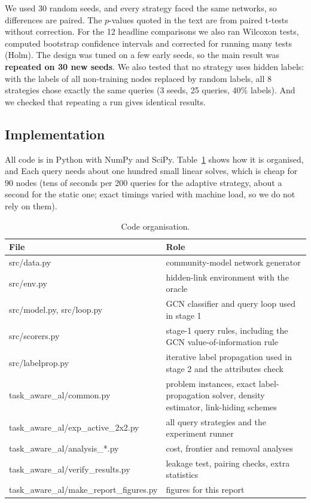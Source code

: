\documentclass[11pt,a4paper]{article}
\begin{document}
We used 30 random seeds, and every strategy faced the same networks, so differences are
paired. The $p$-values quoted in the text are from paired t-tests without correction. For the 12
headline comparisons we also ran Wilcoxon tests, computed bootstrap
confidence intervals and corrected for running many tests (Holm). The design was tuned on a few
early seeds, so the main result was \textbf{repeated on 30 new seeds}. We also tested that no
strategy uses hidden labels: with the labels of all non-training nodes replaced by random
labels, all 8 strategies chose exactly the same queries (3 seeds, 25 queries, 40\% labels). And
we checked that repeating a run gives identical results.

\subsection{Implementation}
All code is in Python with NumPy and SciPy. Table~\ref{tab:code} shows how it is organised, and
Each query needs about
one hundred small linear solves, which is cheap for 90 nodes (tens of seconds per 200 queries
for the adaptive strategy, about a second for the static one; exact timings varied with machine
load, so we do not rely on them).

\begin{table}[htbp]
\centering
\caption{Code organisation.}
\label{tab:code}
\small
\begin{tabularx}{\textwidth}{>{\footnotesize\ttfamily\raggedright\arraybackslash}p{6.2cm}X}
\toprule
\normalfont File & \normalfont Role\\
\midrule
src/data.py & community-model network generator\\
src/env.py & hidden-link environment with the oracle\\
src/model.py, src/loop.py & GCN classifier and query loop used in stage 1\\
src/scorers.py & stage-1 query rules, including the GCN value-of-information rule\\
src/labelprop.py & iterative label propagation used in stage 2 and the attributes check\\
task\_aware\_al/common.py & problem instances, exact label-propagation solver, density estimator, link-hiding schemes\\
task\_aware\_al/exp\_active\_2x2.py & all query strategies and the experiment runner\\
task\_aware\_al/analysis\_*.py & cost, frontier and removal analyses\\
task\_aware\_al/verify\_results.py & leakage test, pairing checks, extra statistics\\
task\_aware\_al/make\_report\_figures.py & figures for this report\\
\bottomrule
\end{tabularx}
\end{table}
\end{document}
